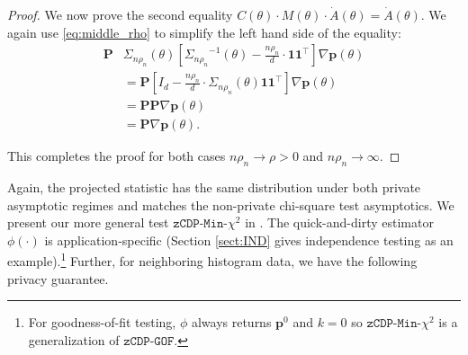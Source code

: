 \documentclass[twoside,letterpaper]{article} \usepackage{aistats2017}
\theoremstyle{definition}
\theoremstyle{remark}
\begin{document}
\begin{proof}
We now prove the second equality $C(\theta) \cdot M(\theta)\cdot  \dot{A}(\theta) = \dot{A}(\theta)$.  We again use \eqref{eq:middle_rho} to simplify the left hand side of the equality:
\begin{align*}
{\pmb{P}} & {{\Sigma}_{{n \rho_n}}}(\theta) \left[  {{\Sigma}_{{n \rho_n}}}^{-1}(\theta) - \frac{n \rho_n}{d} \cdot \pmb{1}\pmb{1}^\intercal \right] \nabla {\mathbf{p}}(\theta) \\
& = {\pmb{P}}  \left[ I_d - \frac{n \rho_n}{d}\cdot {{\Sigma}_{{n \rho_n}}}(\theta)\pmb{1}\pmb{1}^\intercal \right] \nabla {\mathbf{p}}(\theta) \\
& =  {\pmb{P}}  {\pmb{P}} \nabla {\mathbf{p}}(\theta) \\
& = {\pmb{P}} \nabla {\mathbf{p}}(\theta).
\end{align*}

This completes the proof for both cases $n \rho_n \to \rho>0$ and $n \rho_n \to \infty$.

\end{proof}
\fi
Again, the projected statistic has the same distribution under both private asymptotic regimes and matches the non-private chi-square test asymptotics.  We present our more general test ${\texttt{zCDP-Min-$\chi^2$}}$ in .
The quick-and-dirty estimator $\phi(\cdot)$ is application-specific
(Section \ref{sect:IND} gives independence testing as an example).\footnote{For goodness-of-fit testing, $\phi$ always returns ${{\mathbf{p}}^0}$ and $k=0$ so ${\texttt{zCDP-Min-$\chi^2$}}$ is a generalization of ${\texttt{zCDP-GOF}}$.}  Further, for neighboring histogram data, we have the following privacy guarantee.
\end{document}
